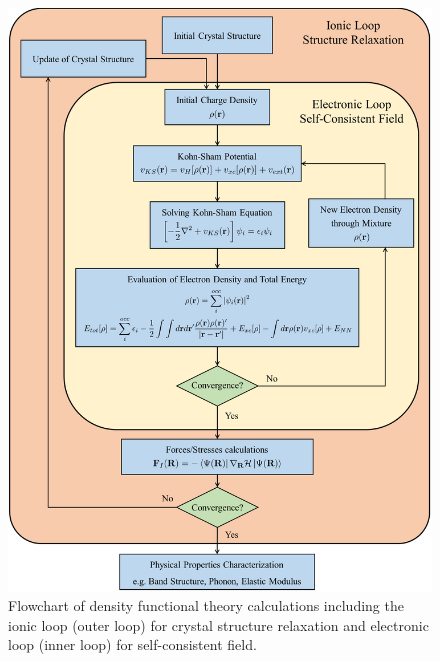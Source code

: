     \begin{figure}[htbp]
        \centering
        \captionsetup{singlelinecheck = false, justification=justified}
        \includegraphics[width=1.0\textwidth]{DFT_flowchart.png}
        \caption[Flowchart of density functional theory calculations.]{Flowchart of density functional theory calculations including the ionic loop (outer loop) for crystal structure relaxation and electronic loop (inner loop) for self-consistent field.}
        \label{fig:DFT_flowchart}
    \end{figure}

\pagebreak




